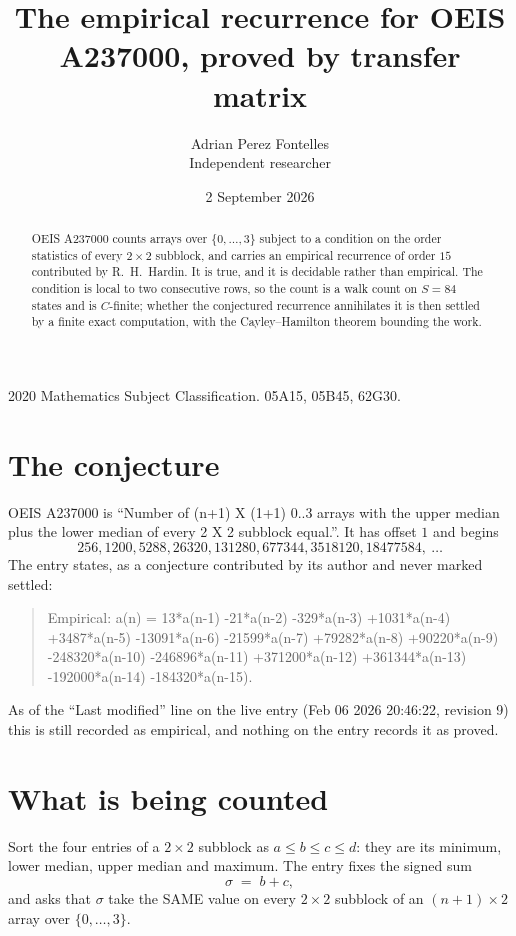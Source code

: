 \documentclass[11pt,a4paper]{article}
\title{The empirical recurrence for OEIS A237000, proved by transfer matrix}
\author{Adrian Perez Fontelles\\ \small Independent researcher}
\date{2 September 2026}
\theoremstyle{plain}
\theoremstyle{definition}
\begin{document}
\maketitle

\begin{abstract}
OEIS A237000 counts arrays over $\{0,\dots,3\}$ subject to a condition on the order
statistics of every $2\times2$ subblock, and carries an empirical recurrence of order
$15$ contributed by R.~H.~Hardin. It is true, and it is decidable rather than empirical.
The condition is local to two consecutive rows, so the count is a walk count on $S=84$
states and is $C$-finite; whether the conjectured recurrence annihilates it is then settled by
a finite exact computation, with the Cayley--Hamilton theorem bounding the work.
\end{abstract}

\noindent\small 2020 Mathematics Subject Classification. 05A15, 05B45, 62G30.\normalsize

\section{The conjecture}

OEIS A237000 is ``Number of (n+1) X (1+1) 0..3 arrays with the upper median plus the lower median of every 2 X 2 subblock equal.''. It has offset $1$ and begins
\[
256, 1200, 5288, 26320, 131280, 677344, 3518120, 18477584,\ \dots
\]
The entry states, as a conjecture contributed by its author and never marked settled:
\begin{quote}
Empirical: a(n) = 13*a(n-1) -21*a(n-2) -329*a(n-3) +1031*a(n-4) +3487*a(n-5) -13091*a(n-6) -21599*a(n-7) +79282*a(n-8) +90220*a(n-9) -248320*a(n-10) -246896*a(n-11) +371200*a(n-12) +361344*a(n-13) -192000*a(n-14) -184320*a(n-15).
\end{quote}
As of the ``Last modified'' line on the live entry (Feb 06 2026 20:46:22, revision 9) this is still
recorded as empirical, and nothing on the entry records it as proved.

\section{What is being counted}

Sort the four entries of a $2\times2$ subblock as $a\le b\le c\le d$: they
are its minimum, lower median, upper median and maximum. The entry fixes the signed sum
\[
\sigma\;=\;b+c,
\]
and asks that $\sigma$ take the SAME value on every $2\times2$ subblock of an
$(n+1)\times2$ array over $\{0,\dots,3\}$.
\end{document}
